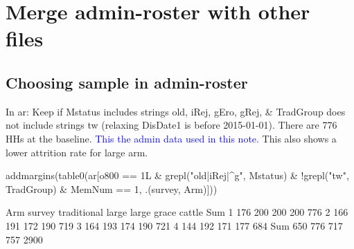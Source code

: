 \section{Merge admin-roster with other files}

\subsection{Choosing sample in admin-roster}

In \textsf{ar}: Keep if \textsf{Mstatus} includes strings old, iRej, gEro, gRej, \& \textsf{TradGroup} does not include strings tw (relaxing  \textsf{DisDate1} is before 2015-01-01). There are 776 HHs at the baseline. \textcolor{blue}{This the admin data used in this note.} This also shows a lower attrition rate for \textsf{large} arm. \gobblepars

\begin{Schunk}
\begin{Sinput}
addmargins(table0(ar[o800 == 1L & grepl("old|iRej|^g", Mstatus) & 
  !grepl("tw", TradGroup) & MemNum == 1, .(survey, Arm)])) 
\end{Sinput}
\begin{Soutput}
      Arm
survey traditional large large grace cattle  Sum
   1           176   200         200    200  776
   2           166   191         172    190  719
   3           164   193         174    190  721
   4           144   192         171    177  684
   Sum         650   776         717    757 2900
\end{Soutput}
\end{Schunk}

